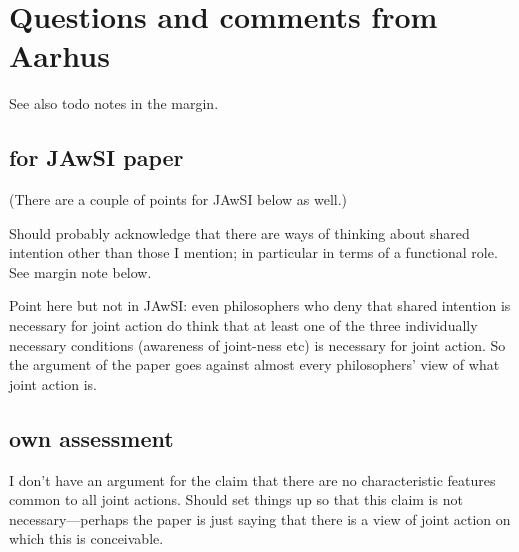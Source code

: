 \documentclass[12pt,a4paper]{extarticle}
\title{\ititle}
\author{\iauthor\\<\iemail>}
\begin{document}
\setlength\footnotesep{1em}


\maketitle

\begin{abstract}
Philosophical accounts of joint action tend to start from the premise that all joint actions involve shared intention.  This premise constrains the roles that imagination and emotion could play in joint action.  But there are empirical and philosophical grounds for doubting the premise.  Such doubts motivate pluralism about joint action, the view that no single substantive account of joint action applies to every case.  If (as argued) there are significant kinds of joint action which do not necessarily involve shared intention, then understanding constitutive features of some kinds of joint action may require identifying roles for imagination or emotion.  
\end{abstract}

\section{Questions and comments from Aarhus}
See also todo notes in the margin.

\subsection{for JAwSI paper}
(There are a couple of points for JAwSI below as well.)

Should probably acknowledge that there are ways of thinking about shared intention other than those I mention; in particular in terms of a functional role.  See margin note below.

Point here but not in JAwSI: even philosophers who deny that shared intention is necessary for joint action do think that at least one of the three individually necessary conditions (awareness of joint-ness etc) is necessary for joint action.  So the argument of the paper goes against almost every philosophers' view of what joint action is.


\subsection{own assessment}
I don't have an argument for the claim that there are no characteristic features common to all joint actions.  Should set things up so that this claim is not necessary---perhaps the paper is just saying that there is a view of joint action on which this is conceivable.
\end{document}
